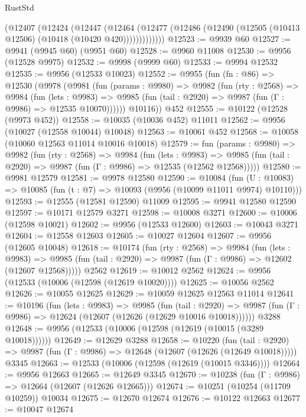 \begin{lexlean}{RustStd}
\begin{coremodule}
          (@12407
            (@12424
              (@12447
                (@12464
                  (@12477 (@12486 (@12490 (@12505 (@10413 @12506) (@10418 (@10420 @420)))))))))))))
@12523 := @9939 @60
@12527 := @9941 (@9945 @60) (@9951 @60)
@12528 := @9960 @11008
@12530 := @9956 (@12528 @9975)
@12532 := @9998 (@9999 @60)
@12533 := @9994 @12532
@12535 := @9956 (@12533 @10023)
@12552 := @9955
    (fun (fn : @86) =>
    @12530
      (@9978
        (@9981
          (fun (params : @9980) =>
          @9982
            (fun (rty : @2568) =>
            @9984
              (fun (lets : @9983) =>
              @9985 (fun (tail : @2920) => @9987 (fun (Γ : @9986) => @12535 @10070))))))
        @10116))
    @452
@12555 := @10122 (@12528 (@9973 @452))
@12558 := @10035 (@10036 @452) @11011
@12562 := @9956 (@10027 (@12558 @10044) @10048)
@12563 := @10061 @452
@12568 := @10058 (@10060 @12563 @11014 @10016 @10018)
@12579 := fun (params : @9980) =>
  @9982
    (fun (rty : @2568) =>
    @9984
      (fun (lets : @9983) =>
      @9985 (fun (tail : @2920) => @9987 (fun (Γ : @9986) => @12535 (@12562 @12568)))))
@12580 := @9981 @12579
@12581 := @9978 @12580
@12590 := @10084
    (fun (U : @10083) => @10085 (fun (t : @7) => @10093 (@9956 (@10099 @11011 @9974) @10110)))
@12593 := @12555 (@12581 @12590) @11009
@12595 := @9941 @12580 @12590
@12597 := @10171 @12579 @3271
@12598 := @10008 @3271
@12600 := @10006 (@12598 @10021)
@12602 := @9956 (@12533 @12600)
@12603 := @10043 @3271
@12604 := @12558 @12603
@12605 := @10027 @12604
@12607 := @9956 (@12605 @10048)
@12618 := @10174
    (fun (rty : @2568) =>
    @9984
      (fun (lets : @9983) =>
      @9985 (fun (tail : @2920) => @9987 (fun (Γ : @9986) => @12602 (@12607 @12568)))))
    @2562
@12619 := @10012 @2562
@12624 := @9956 (@12533 (@10006 (@12598 (@12619 @10020))))
@12625 := @10056 @2562
@12626 := @10055 @12625
@12629 := @10059 @12625 @12563 @11014
@12641 := @10196
    (fun (lets : @9983) =>
    @9985
      (fun (tail : @2920) =>
      @9987 (fun (Γ : @9986) => @12624 (@12607 (@12626 (@12629 @10016 @10018))))))
    @3288
@12648 := @9956 (@12533 (@10006 (@12598 (@12619 (@10015 (@3289 @10018))))))
@12649 := @12629 @3288
@12658 := @10220
    (fun (tail : @2920) => @9987 (fun (Γ : @9986) => @12648 (@12607 (@12626 (@12649 @10018)))))
    @3345
@12663 := @12533 (@10006 (@12598 (@12619 (@10015 @3346))))
@12664 := @9956 @12663
@12665 := @12649 @3345
@12670 := @10238 (fun (Γ : @9986) => @12664 (@12607 (@12626 @12665)))
@12674 := @10251 (@10254 (@11709 @10259)) @10034
@12675 := @12670 @12674
@12676 := @10122 @12663
@12677 := @10047 @12674

\end{coremodule}
\end{lexlean}
